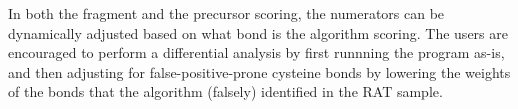In both the fragment and the precursor scoring, the numerators can be dynamically adjusted based on what bond is the algorithm scoring. The users are encouraged to perform a differential analysis by first runnning the program as-is, and then adjusting for false-positive-prone cysteine bonds by lowering the weights of the bonds that the algorithm (falsely) identified in the RAT sample.








